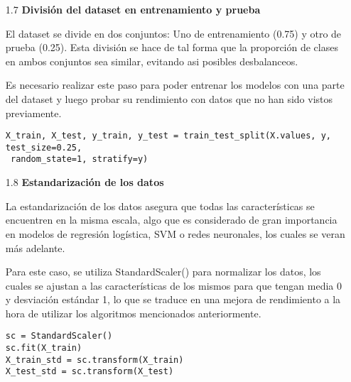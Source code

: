 \documentclass{article}
\begin{document}
\bigskip

\begin{itemize}

\item[1.7]  {\bf Divisi\'on del dataset en entrenamiento y prueba}

El dataset se divide en dos conjuntos: Uno de entrenamiento (0.75) y otro de prueba (0.25). Esta divisi\'on se hace de tal forma que la proporci\'on de clases en ambos conjuntos sea similar, evitando asi posibles desbalanceos.

Es necesario realizar este paso para poder entrenar los modelos con una parte del dataset y luego probar su rendimiento con datos que no han sido vistos previamente.

\begin{tcolorbox}[width=14cm]
\begin{scriptsize}
\begin{verbatim}
X_train, X_test, y_train, y_test = train_test_split(X.values, y, test_size=0.25,
 random_state=1, stratify=y)
\end{verbatim}
\end{scriptsize}
\end{tcolorbox}

\end{itemize}

\bigskip

\begin{itemize}

\item[1.8]  {\bf Estandarizaci\'on de los datos}

La estandarizaci\'on de los datos asegura que todas las caracter\'isticas se encuentren en la misma escala, algo que es considerado de gran importancia en modelos de regresi\'on log\'istica, SVM o redes neuronales, los cuales se veran m\'as adelante.

Para este caso, se utiliza StandardScaler() para normalizar los datos, los cuales se ajustan a las caracter\'isticas de los mismos para que tengan media 0 y desviaci\'on est\'andar 1, lo que se traduce en una mejora de rendimiento a la hora de utilizar los algoritmos mencionados anteriormente.

\begin{tcolorbox}[width=14cm]
\begin{scriptsize}
\begin{verbatim}
sc = StandardScaler()
sc.fit(X_train)
X_train_std = sc.transform(X_train)
X_test_std = sc.transform(X_test)
\end{verbatim}
\end{scriptsize}
\end{tcolorbox}

\end{itemize}
\end{document}
